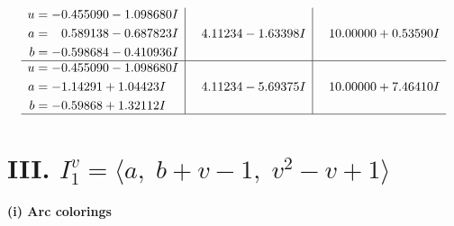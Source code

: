 \documentclass[1p]{elsarticle_modified}
\theoremstyle{definition}
\begin{document}
$$\begin{array}{c|c|c}
\begin{aligned}
u &= -0.455090 - 1.098680 I \\
a &= \phantom{-}0.589138 - 0.687823 I \\
b &= -0.598684 - 0.410936 I\end{aligned}
 & \phantom{-}4.11234 - 1.63398 I & \phantom{-}10.00000 + 0.53590 I \\ \hline\begin{aligned}
u &= -0.455090 - 1.098680 I \\
a &= -1.14291 + 1.04423 I \\
b &= -0.59868 + 1.32112 I\end{aligned}
 & \phantom{-}4.11234 - 5.69375 I & \phantom{-}10.00000 + 7.46410 I\\
 \hline 
 \end{array}$$\newpage\newpage\renewcommand{\arraystretch}{1}
\centering \section*{III. $I^v_{1}= \langle a,\;b+v-1,\;v^2- v+1 \rangle$}
\flushleft \textbf{(i) Arc colorings}\\
\end{document}
